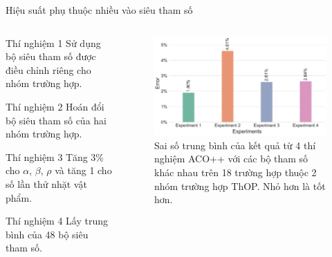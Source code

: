 \documentclass[aspectratio=169]{beamer}
\begin{document}
\begin{frame}{Hiệu suất phụ thuộc nhiều vào siêu tham số}
    \begin{columns}
        \begin{column}{0.45\textwidth}
            \vspace{-0.3cm}
            \footnotesize
            \begin{block}{\footnotesize Thí nghiệm 1}
                Sử dụng bộ siêu tham số được điều chỉnh riêng cho nhóm trường hợp.
            \end{block}
            \begin{block}{\footnotesize Thí nghiệm 2}
                Hoán đổi bộ siêu tham số của hai nhóm trường hợp.
            \end{block}
            \begin{block}{\footnotesize Thí nghiệm 3}
                Tăng 3\% cho $\alpha$, $\beta$, $\rho$ và tăng 1 cho số lần thử nhặt vật phẩm.
            \end{block}
            \begin{block}{\footnotesize Thí nghiệm 4}
                Lấy trung bình của 48 bộ siêu tham số.
            \end{block}
        \end{column}
        \begin{column}{0.45\textwidth}
            \begin{figure}[h]
                \centering
                \includegraphics[width=\linewidth]{img/sensitive_error_rate.pdf}
                \caption{\footnotesize\justifying Sai số trung bình của kết quả từ 4 thí nghiệm ACO++ với các bộ tham số khác nhau trên 18 trường hợp thuộc 2 nhóm trường hợp ThOP. Nhỏ hơn là tốt hơn.}
                \label{fig:sensitive}
            \end{figure}
        \end{column}
    \end{columns}
\end{frame}
\end{document}

